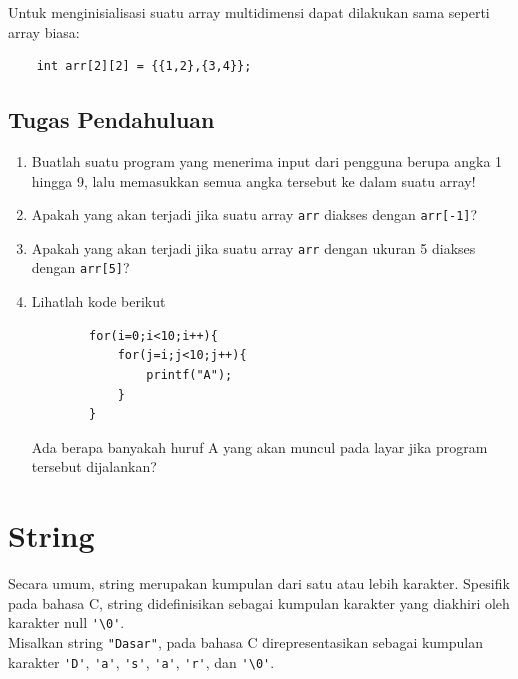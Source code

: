 Untuk menginisialisasi suatu array multidimensi dapat dilakukan sama seperti array biasa:
\begin{verbatim}
    int arr[2][2] = {{1,2},{3,4}};
\end{verbatim}

\subsection{Tugas Pendahuluan}
\begin{enumerate}
	\item Buatlah suatu program yang menerima input dari pengguna berupa angka 1 hingga 9, lalu memasukkan semua angka tersebut ke dalam suatu array!
	\item Apakah yang akan terjadi jika suatu array \verb|arr| diakses dengan \verb|arr[-1]|?
	\item Apakah yang akan terjadi jika suatu array \verb|arr| dengan ukuran 5 diakses dengan \verb|arr[5]|?
	\item Lihatlah kode berikut
	      \begin{verbatim}
        for(i=0;i<10;i++){
            for(j=i;j<10;j++){
                printf("A");
            }
        }
    \end{verbatim}
	      Ada berapa banyakah huruf A yang akan muncul pada layar jika program tersebut dijalankan?
\end{enumerate}

\section{String}
Secara umum, string merupakan kumpulan dari satu atau lebih karakter. Spesifik pada bahasa C, string didefinisikan sebagai kumpulan karakter yang diakhiri oleh karakter null \verb|'\0'|.
\\
Misalkan string  \verb|"Dasar"|, pada bahasa C direpresentasikan sebagai kumpulan karakter \verb|'D'|, \verb|'a'|, \verb|'s'|, \verb|'a'|, \verb|'r'|, dan \verb|'\0'|.

